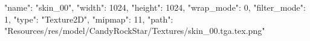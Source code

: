 {
  "name": "skin_00",
  "width": 1024,
  "height": 1024,
  "wrap_mode": 0,
  "filter_mode": 1,
  "type": "Texture2D",
  "mipmap": 11,
  "path": "Resources/res/model/CandyRockStar/Textures/skin_00.tga.tex.png"
}